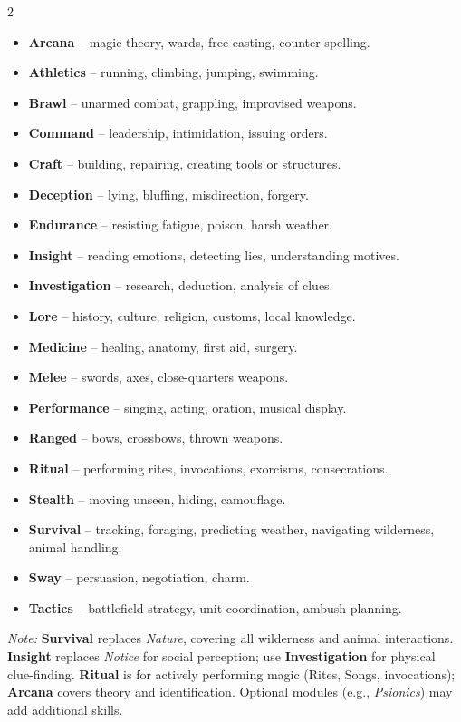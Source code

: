 \begin{multicols}{2}
\begin{itemize}[leftmargin=*]
  \item \textbf{Arcana} – magic theory, wards, free casting, counter-spelling.
  \item \textbf{Athletics} – running, climbing, jumping, swimming.
  \item \textbf{Brawl} – unarmed combat, grappling, improvised weapons.
  \item \textbf{Command} – leadership, intimidation, issuing orders.
  \item \textbf{Craft} – building, repairing, creating tools or structures.
  \item \textbf{Deception} – lying, bluffing, misdirection, forgery.
  \item \textbf{Endurance} – resisting fatigue, poison, harsh weather.
  \item \textbf{Insight} – reading emotions, detecting lies, understanding motives.
  \item \textbf{Investigation} – research, deduction, analysis of clues.
  \item \textbf{Lore} – history, culture, religion, customs, local knowledge.
  \item \textbf{Medicine} – healing, anatomy, first aid, surgery.
  \item \textbf{Melee} – swords, axes, close-quarters weapons.
  \item \textbf{Performance} – singing, acting, oration, musical display.
  \item \textbf{Ranged} – bows, crossbows, thrown weapons.
  \item \textbf{Ritual} – performing rites, invocations, exorcisms, consecrations.
  \item \textbf{Stealth} – moving unseen, hiding, camouflage.
  \item \textbf{Survival} – tracking, foraging, predicting weather, navigating wilderness, animal handling.
  \item \textbf{Sway} – persuasion, negotiation, charm.
  \item \textbf{Tactics} – battlefield strategy, unit coordination, ambush planning.
\end{itemize}
\end{multicols}

\noindent
\textit{Note:} \textbf{Survival} replaces \textit{Nature}, covering all wilderness and animal interactions. \textbf{Insight} replaces \textit{Notice} for social perception; use \textbf{Investigation} for physical clue-finding. \textbf{Ritual} is for actively performing magic (Rites, Songs, invocations); \textbf{Arcana} covers theory and identification.  
Optional modules (e.g., \textit{Psionics}) may add additional skills.

